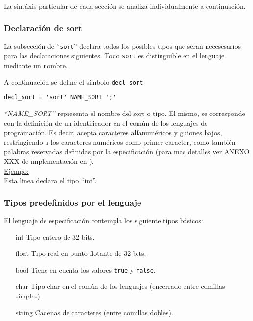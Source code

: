 La sintáxis particular de cada sección se analiza individualmente a continuación.

\subsubsection{Declaración de sort}
La subsección de ``\texttt{sort}'' declara todos los posibles tipos que seran necesesarios para las declaraciones siguientes. Todo \texttt{sort} es distinguible en el lenguaje mediante un nombre.

A continuación se define el símbolo \texttt{decl\_sort}

\begin{center}
\lstset{language=inform}
\begin{lstlisting}
decl_sort = 'sort' NAME_SORT ';'
\end{lstlisting}
\end{center}

\textit{``NAME\_SORT''} representa el nombre del sort o tipo. El mismo, se corresponde con la definición de un identificador en el común de los lenguajes de programación. Es decir, acepta caracteres alfanuméricos y guiones bajos, restringiendo a los caracteres numéricos como primer caracter, como también palabras reservadas definidas por la especificación (para mas detalles ver ANEXO  XXX de implementación en \spirit).\\

\underline{Ejempo:}\ \\
\vspace{0.2cm}
Esta línea declara el tipo ``int''.\\

\subsubsection*{Tipos predefinidos por el lenguaje}
\label{sec:typepredefined}

El lenguaje de especificación contempla los siguiente tipos básicos:

\begin{itemize}
\item [int] Tipo entero de 32 bits.

\item [float] Tipo real en punto flotante de 32 bits.

\item [bool] Tiene en cuenta los valores \texttt{true} y \texttt{false}.

\item [char] Tipo char en el común de los lenguajes (encerrado entre comillas simples).

\item [string] Cadenas de caracteres (entre comillas dobles).
\end{itemize}

